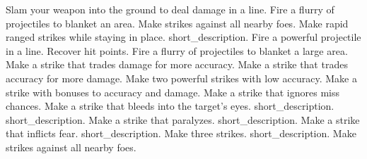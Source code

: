\begin{spelllist}
 Slam your weapon into the ground to deal damage in a line.
 Fire a flurry of projectiles to blanket an area.
 Make strikes against all nearby foes.
 Make rapid ranged strikes while staying in place.
 short_description.
 Fire a powerful projectile in a line.
 Recover hit points.
 Fire a flurry of projectiles to blanket a large area.
 Make a strike that trades damage for more accuracy.
 Make a strike that trades accuracy for more damage.
 Make two powerful strikes with low accuracy.
 Make a strike with bonuses to accuracy and damage.
 Make a strike that ignores miss chances.
 Make a strike that bleeds into the target's eyes.
 short_description.
 short_description.
 Make a strike that paralyzes.
 short_description.
 Make a strike that inflicts fear.
 short_description.
 Make three strikes.
 short_description.
 Make strikes against all nearby foes.
\end{spelllist}



\small
